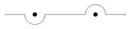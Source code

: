 \documentclass{article}
\begin{document}
\begin{preview}

$\begin{tikzpicture}
\draw[->] (-3,0) -- (-2,0) arc[radius=0.5cm,start angle=-180,end angle=0] (-1,0) -- (1,0) arc[radius=0.5cm,start angle=180,end angle=0] (2,0) -- (3,0);
\filldraw (-1.5,0) circle[radius=1mm];
\filldraw (1.5,0) circle[radius=1mm];
\end{tikzpicture}$
\end{preview}
\end{document}
